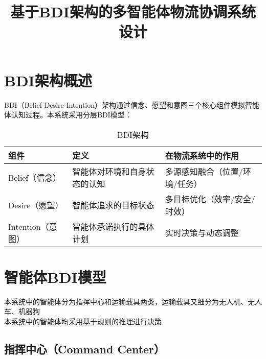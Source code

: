 \documentclass[12pt,a4paper]{article}
\title{基于BDI架构的多智能体物流协调系统设计}
\author{}
\date{}
\begin{document}
\maketitle

\section{BDI架构概述}

BDI（Belief-Desire-Intention）架构通过信念、愿望和意图三个核心组件模拟智能体认知过程。本系统采用分层BDI模型：

\begin{table}[h]
\centering
\caption{BDI架构}
\begin{tabular}{|>{\centering\arraybackslash}p{3.3cm}|>{\raggedright\arraybackslash}p{5cm}|>{\raggedright\arraybackslash}p{6cm}|}
\hline
\textbf{组件} & \textbf{定义} & \textbf{在物流系统中的作用} \\
\hline
\rowcolor{lightgray}
Belief（信念） & 智能体对环境和自身状态的认知 & 多源感知融合（位置/环境/任务） \\
\hline
Desire（愿望） & 智能体追求的目标状态 & 多目标优化（效率/安全/时效） \\
\hline
\rowcolor{lightgray}
Intention（意图） & 智能体承诺执行的具体计划 & 实时决策与动态调整 \\
\hline
\end{tabular}
\end{table}

\section{智能体BDI模型}

本系统中的智能体分为指挥中心和运输载具两类，运输载具又细分为无人机、无人车、机器狗\\
本系统中的智能体均采用基于规则的推理进行决策

\subsection{指挥中心（Command Center）}

\clearpage
\end{document}
